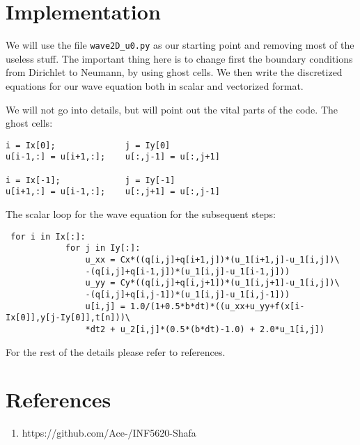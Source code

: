 \documentclass{article}
\begin{document}
\section{Implementation}
We will use the file \texttt{wave2D\_u0.py} as our starting point and removing most of the useless stuff. The important thing here is to change first the boundary conditions from Dirichlet to Neumann, by using ghost cells. We then write the discretized equations for our wave equation both in scalar and vectorized format. 

We will not go into details, but will point out the vital parts of the code. The ghost cells: 
\begin{verbatim}
i = Ix[0];              j = Iy[0]
u[i-1,:] = u[i+1,:];    u[:,j-1] = u[:,j+1]

i = Ix[-1];             j = Iy[-1]
u[i+1,:] = u[i-1,:];    u[:,j+1] = u[:,j-1]
\end{verbatim}
\newpage
The scalar loop for the wave equation for the subsequent steps:
\begin{verbatim}
 for i in Ix[:]:
            for j in Iy[:]:
                u_xx = Cx*((q[i,j]+q[i+1,j])*(u_1[i+1,j]-u_1[i,j])\
                -(q[i,j]+q[i-1,j])*(u_1[i,j]-u_1[i-1,j]))
                u_yy = Cy*((q[i,j]+q[i,j+1])*(u_1[i,j+1]-u_1[i,j])\
                -(q[i,j]+q[i,j-1])*(u_1[i,j]-u_1[i,j-1]))
                u[i,j] = 1.0/(1+0.5*b*dt)*((u_xx+u_yy+f(x[i-Ix[0]],y[j-Iy[0]],t[n]))\
                *dt2 + u_2[i,j]*(0.5*(b*dt)-1.0) + 2.0*u_1[i,j])
\end{verbatim}
For the rest of the details please refer to references. 

\section{References}
\begin{enumerate}
\item
https://github.com/Ace-/INF5620-Shafa
%
\end{enumerate}
\end{document}
